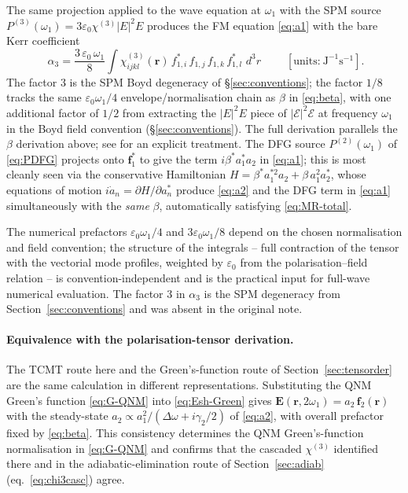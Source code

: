 \documentclass[11pt,a4paper]{article}
\newcommand{\eps}{\varepsilon}
\newcommand{\bvec}[1]{\mathbf{#1}}
\newcommand{\f}{\bvec{f}}
\newcommand{\ri}{\bvec{r}}
\newcommand{\dthreer}{\,d^{3}r}
\newcommand{\chithree}{\chi^{(3)}}
\newcommand{\Dom}{\Delta\omega}
\begin{document}
The same projection applied to the wave equation at $\omega_1$ with
the SPM source $P^{(3)}(\omega_1)=3\eps_0\chithree|E|^{2}E$ produces
the FM equation \eqref{eq:a1} with the bare Kerr coefficient
\begin{equation}
  \boxed{\;\alpha_3=\frac{3\,\eps_0\,\omega_1}{8}\!\int\!\chithree_{ijkl}(\ri)\,
                  f_{1,i}^*\,f_{1,j}\,f_{1,k}\,f_{1,l}^*\,\dthreer\;}
  \qquad[\text{units:}\ \mathrm{J}^{-1}\mathrm{s}^{-1}].
\label{eq:alpha3}
\end{equation}
The factor $3$ is the SPM Boyd degeneracy of
\S\ref{sec:conventions}; the factor $1/8$ tracks the same
$\eps_0\omega_1/4$ envelope/normalisation chain as $\beta$ in
\eqref{eq:beta}, with one additional factor of $1/2$ from extracting
the $|E|^{2}E$ piece of $|\mathcal{E}|^{2}\mathcal{E}$ at frequency
$\omega_1$ in the Boyd field convention (\S\ref{sec:conventions}).
The full derivation parallels the $\beta$ derivation above; see
\cite[Eq.~(8)]{Rodriguez2007} for an explicit treatment.
The DFG source $P^{(2)}(\omega_1)$ of \eqref{eq:PDFG} projects onto
$\f_1^*$ to give the term $i\beta^{*}a_1^{*}a_2$ in \eqref{eq:a1};
this is most cleanly seen via the conservative Hamiltonian
$H=\beta^{*}a_1^{*2}a_2+\beta\,a_1^{2}a_2^{*}$, whose equations of
motion $i\dot a_n=\partial H/\partial a_n^{*}$ produce \eqref{eq:a2}
and the DFG term in \eqref{eq:a1} simultaneously with the
\emph{same} $\beta$, automatically satisfying \eqref{eq:MR-total}.

The numerical prefactors $\eps_0\omega_1/4$ and $3\eps_0\omega_1/8$
depend on the chosen normalisation and field convention; the
structure of the integrals -- full contraction of the tensor with the
vectorial mode profiles, weighted by $\eps_0$ from the
polarisation--field relation -- is convention-independent and is the
practical input for full-wave numerical evaluation.  The factor $3$
in $\alpha_3$ is the SPM degeneracy from
Section~\ref{sec:conventions} and was absent in the original note.

\paragraph{Equivalence with the polarisation-tensor derivation.}
The TCMT route here and the Green's-function route of
Section~\ref{sec:tensorder} are the same calculation in different
representations.  Substituting the QNM Green's function
\eqref{eq:G-QNM} into \eqref{eq:Esh-Green} gives
$\mathbf E(\ri,2\omega_1)=a_2\,\f_2(\ri)$ with the steady-state
$a_2\propto a_1^{2}/(\Dom+i\gamma_2/2)$ of \eqref{eq:a2}, with
overall prefactor fixed by \eqref{eq:beta}.  This consistency
determines the QNM Green's-function normalisation in \eqref{eq:G-QNM}
and confirms that the cascaded $\chithree$ identified there and
in the adiabatic-elimination route of Section~\ref{sec:adiab}
(eq.~\eqref{eq:chi3casc}) agree.
\end{document}
